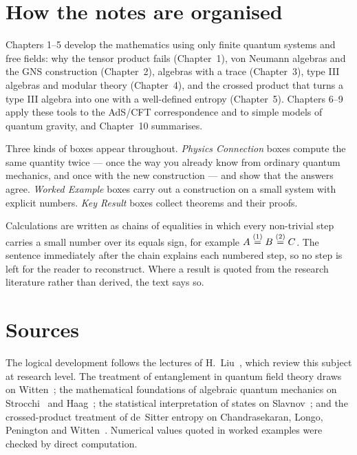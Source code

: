 \documentclass[11pt]{report}
\begin{document}
\section*{How the notes are organised}

Chapters 1--5 develop the mathematics using only finite quantum systems and free fields: why the tensor
product fails (Chapter~1), von Neumann algebras and the GNS construction (Chapter~2), algebras with a trace
(Chapter~3), type III algebras and modular theory (Chapter~4), and the crossed product that turns a type III
algebra into one with a well-defined entropy (Chapter~5). Chapters 6--9 apply these tools to the AdS/CFT
correspondence and to simple models of quantum gravity, and Chapter~10 summarises.

Three kinds of boxes appear throughout. \emph{Physics Connection} boxes compute the same quantity twice ---
once the way you already know from ordinary quantum mechanics, and once with the new construction --- and show
that the answers agree. \emph{Worked Example} boxes carry out a construction on a small system with explicit
numbers. \emph{Key Result} boxes collect theorems and their proofs.

Calculations are written as chains of equalities in which every non-trivial step carries a small number over
its equals sign, for example $A\overset{(1)}{=}B\overset{(2)}{=}C$. The sentence immediately after the chain explains each
numbered step, so no step is left for the reader to reconstruct. Where a result is quoted from the research
literature rather than derived, the text says so.

\section*{Sources}

The logical development follows the lectures of H.~Liu~\cite{Liu2025}, which review this subject at research
level. The treatment of entanglement in quantum field theory draws on Witten~\cite{Witten2018}; the
mathematical foundations of algebraic quantum mechanics on Strocchi~\cite{Strocchi} and Haag~\cite{HaagBook};
the statistical interpretation of states on Slavnov~\cite{Slavnov2001}; and the crossed-product treatment of
de~Sitter entropy on Chandrasekaran, Longo, Penington and Witten~\cite{CLPW}. Numerical values quoted in worked
examples were checked by direct computation.

\tableofcontents











\end{document}
